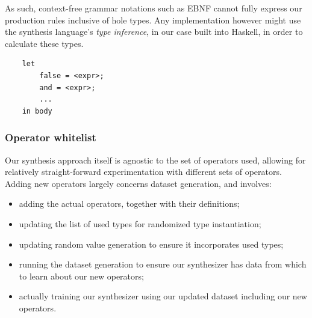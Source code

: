 \documentclass{article}
\begin{document}
As such, context-free grammar notations such as EBNF cannot fully express our production rules inclusive of hole types.
Any implementation however might use the synthesis language's \emph{type inference},
in our case built into Haskell, in order to calculate these types.



\begin{verbatim}
    let
        false = <expr>;
        and = <expr>;
        ...
    in body
\end{verbatim}

\subsubsection{Operator whitelist}

Our synthesis approach itself is agnostic to the set of operators used,
allowing for relatively straight-forward experimentation with different sets of operators.
Adding new operators largely concerns dataset generation, and involves:
\begin{itemize}
    \item adding the actual operators, together with their definitions;
    \item updating the list of used types for randomized type instantiation;
    \item updating random value generation to ensure it incorporates used types;
    \item running the dataset generation to ensure our synthesizer has data from which to learn about our new operators;
    \item actually training our synthesizer using our updated dataset including our new operators.
\end{itemize}
\end{document}
